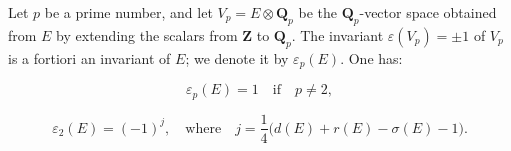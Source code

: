 Let $p$ be a prime number, and let $V_p = E \otimes \mathbf{Q}_p$ be the $\mathbf{Q}_p$-vector space obtained from $E$ by extending the scalars from $\mathbf{Z}$ to $\mathbf{Q}_p$. The invariant $\varepsilon(V_p) = \pm 1$ of $V_p$ is a fortiori an invariant of $E$; we denote it by $\varepsilon_p(E)$. One has:

$$\varepsilon_p(E) = 1 \quad \text{if} \quad p \neq 2,$$

$$\varepsilon_2(E) = (-1)^j, \quad \text{where} \quad j = \frac{1}{4}\bigl(d(E) + r(E) - \sigma(E) - 1\bigr).$$
